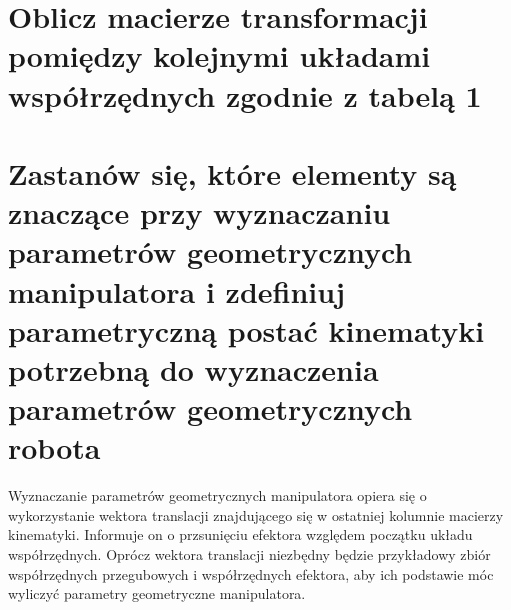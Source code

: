 \documentclass[12pt,a4paper]{article}
\begin{document}
\pdfpageheight   297mm
\pdfpagewidth    210mm

\StronaTytulowa
\SpisTresci

\pagebreak

\section{Oblicz macierze transformacji pomiędzy kolejnymi układami współrzędnych zgodnie z tabelą 1}



  


  \section{Zastanów się, które elementy są znaczące przy wyznaczaniu parametrów geometrycznych manipulatora i zdefiniuj parametryczną postać
  kinematyki potrzebną do wyznaczenia parametrów geometrycznych robota}
  
  Wyznaczanie parametrów geometrycznych manipulatora opiera się o 
  wykorzystanie wektora translacji znajdującego się w ostatniej kolumnie
  macierzy kinematyki. Informuje on o przsunięciu efektora względem 
  początku układu współrzędnych. Oprócz wektora translacji niezbędny będzie
  przykładowy zbiór współrzędnych przegubowych i współrzędnych efektora,
  aby ich podstawie móc wyliczyć parametry geometryczne manipulatora.
  
\end{document}

